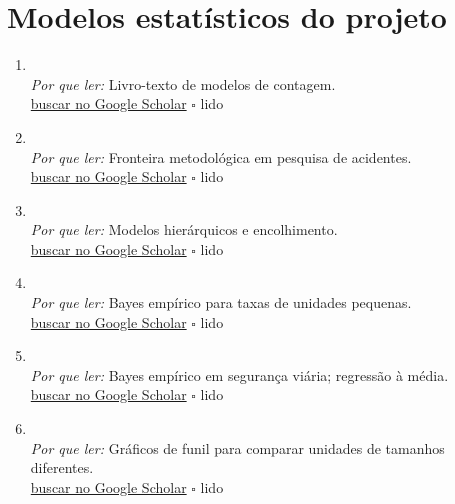 \section{Modelos estatísticos do projeto}
\begin{enumerate}[leftmargin=*]
  \item {}\\
  \textit{Por que ler:} Livro-texto de modelos de contagem.\\
  \href{https://scholar.google.com/scholar?q=Regression+Analysis+of+Count+Data}{buscar no Google Scholar} \hfill $\square$ \textsf{\small lido}
  \item {}\\
  \textit{Por que ler:} Fronteira metodológica em pesquisa de acidentes.\\
  \href{https://scholar.google.com/scholar?q=Analytic+methods+in+accident+research\%3A+methodological+frontier+and+future+directions}{buscar no Google Scholar} \hfill $\square$ \textsf{\small lido}
  \item {}\\
  \textit{Por que ler:} Modelos hierárquicos e encolhimento.\\
  \href{https://scholar.google.com/scholar?q=Data+Analysis+Using+Regression+and+Multilevel\%2FHierarchical+Models}{buscar no Google Scholar} \hfill $\square$ \textsf{\small lido}
  \item {}\\
  \textit{Por que ler:} Bayes empírico para taxas de unidades pequenas.\\
  \href{https://scholar.google.com/scholar?q=Empirical+Bayes+estimates+of+age-standardized+relative+risks+for+use+in+disease+mapping}{buscar no Google Scholar} \hfill $\square$ \textsf{\small lido}
  \item {}\\
  \textit{Por que ler:} Bayes empírico em segurança viária; regressão à média.\\
  \href{https://scholar.google.com/scholar?q=Observational+Before-After+Studies+in+Road+Safety}{buscar no Google Scholar} \hfill $\square$ \textsf{\small lido}
  \item {}\\
  \textit{Por que ler:} Gráficos de funil para comparar unidades de tamanhos diferentes.\\
  \href{https://scholar.google.com/scholar?q=Funnel+plots+for+comparing+institutional+performance}{buscar no Google Scholar} \hfill $\square$ \textsf{\small lido}

\end{enumerate}
